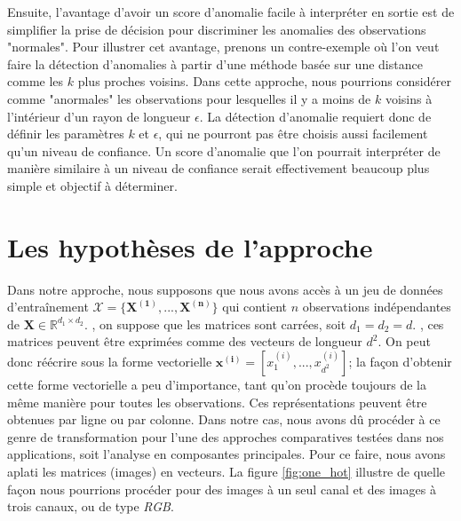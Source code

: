 Ensuite, l'avantage d'avoir un score d'anomalie facile à interpréter en sortie est de simplifier la prise de décision pour discriminer les anomalies des observations "normales". Pour illustrer cet avantage, prenons un contre-exemple où l'on veut faire la détection d'anomalies à partir d'une méthode basée sur une distance comme les $k$ plus proches voisins. Dans cette approche, nous pourrions considérer comme "anormales" les observations pour lesquelles il y a moins de $k$ voisins à l'intérieur d'un rayon de longueur $\epsilon$. La détection d'anomalie requiert donc de définir les paramètres $k$ et $\epsilon$, qui ne pourront pas être choisis aussi facilement qu'un niveau de confiance. Un score d'anomalie que l'on pourrait interpréter de manière similaire à un niveau de confiance serait effectivement beaucoup plus simple et objectif à déterminer.

\section{Les hypothèses de l'approche}

Dans notre approche, nous supposons que  nous avons accès à un jeu de données d'entraînement $\mathcal{X} = \{\boldsymbol{X^{(1)}}, ..., \boldsymbol{X^{(n)}}\}$ qui contient $n$ observations indépendantes de $\mathbf{X} \in \mathbb{R}^{d_1 \times d_2}$. \DIFdelbegin {}\DIFdelend \DIFaddbegin {}\DIFaddend , on suppose que les matrices sont carrées, soit $d_1=d_2=d$. \DIFdelbegin {}\DIFdelend \DIFaddbegin {}\DIFaddend , ces matrices peuvent être exprimées comme des vecteurs de longueur $d^2$. On \DIFaddbegin {}\DIFaddend peut donc réécrire sous la forme vectorielle $\boldsymbol{x^{(i)}} = [x^{(i)}_1,...,x^{(i)}_{d^2}]$; la façon d'obtenir cette forme vectorielle a peu d'importance, tant qu'on procède toujours de la même manière pour toutes les observations. Ces représentations peuvent être obtenues par ligne ou par colonne. Dans notre cas, nous avons dû procéder à ce genre de transformation pour l'une des approches comparatives testées dans nos applications, soit l'analyse en composantes principales. Pour ce faire, nous avons aplati les matrices (images) en vecteurs. La figure \ref{fig:one_hot} illustre de quelle façon nous pourrions procéder pour des images à un seul canal et des images à trois canaux, ou de type \textit{RGB}.

